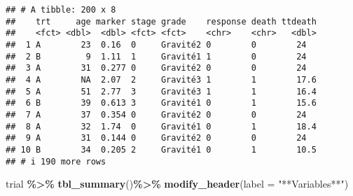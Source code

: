 \documentclass[
]{article}
\newenvironment{Shaded}{\begin{snugshade}}{\end{snugshade}}
\newcommand{\AttributeTok}[1]{\textcolor[rgb]{0.13,0.29,0.53}{#1}}
\newcommand{\FunctionTok}[1]{\textcolor[rgb]{0.13,0.29,0.53}{\textbf{#1}}}
\newcommand{\NormalTok}[1]{#1}
\newcommand{\SpecialCharTok}[1]{\textcolor[rgb]{0.81,0.36,0.00}{\textbf{#1}}}
\newcommand{\StringTok}[1]{\textcolor[rgb]{0.31,0.60,0.02}{#1}}
\begin{document}
\begin{verbatim}
## # A tibble: 200 x 8
##    trt     age marker stage grade    response death ttdeath
##    <fct> <dbl>  <dbl> <fct> <fct>    <chr>    <chr>   <dbl>
##  1 A        23  0.16  0     Gravité2 0        0        24  
##  2 B         9  1.11  1     Gravité1 1        0        24  
##  3 A        31  0.277 0     Gravité2 0        0        24  
##  4 A        NA  2.07  2     Gravité3 1        1        17.6
##  5 A        51  2.77  3     Gravité3 1        1        16.4
##  6 B        39  0.613 3     Gravité1 0        1        15.6
##  7 A        37  0.354 0     Gravité2 0        0        24  
##  8 A        32  1.74  0     Gravité1 0        1        18.4
##  9 A        31  0.144 0     Gravité2 0        0        24  
## 10 B        34  0.205 2     Gravité1 0        1        10.5
## # i 190 more rows
\end{verbatim}

\begin{Shaded}
\begin{Highlighting}[]
\NormalTok{trial }\SpecialCharTok{\%\textgreater{}\%}
  \FunctionTok{tbl\_summary}\NormalTok{()}\SpecialCharTok{\%\textgreater{}\%}
  \FunctionTok{modify\_header}\NormalTok{(}\AttributeTok{label =} \StringTok{"**Variables**"}\NormalTok{)}
\end{Highlighting}
\end{Shaded}
\end{document}
